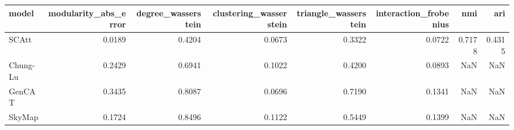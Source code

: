 \begin{tabular}{lrrrrrrr}
\toprule
model & modularity_abs_error & degree_wasserstein & clustering_wasserstein & triangle_wasserstein & interaction_frobenius & nmi & ari \\
\midrule
SCAtt & 0.0189 & 0.4204 & 0.0673 & 0.3322 & 0.0722 & 0.7178 & 0.4315 \\
Chung-Lu & 0.2429 & 0.6941 & 0.1022 & 0.4200 & 0.0893 & NaN & NaN \\
GenCAT & 0.3435 & 0.8087 & 0.0696 & 0.7190 & 0.1341 & NaN & NaN \\
SkyMap & 0.1724 & 0.8496 & 0.1122 & 0.5449 & 0.1399 & NaN & NaN \\
\bottomrule
\end{tabular}

